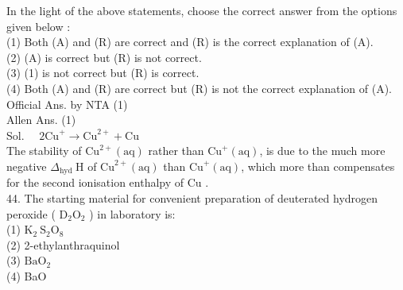 \documentclass[10pt]{article}
\begin{document}
In the light of the above statements, choose the correct answer from the options given below :\\
(1) Both (A) and (R) are correct and (R) is the correct explanation of (A).\\
(2) (A) is correct but (R) is not correct.\\
(3) (1) is not correct but (R) is correct.\\
(4) Both (A) and (R) are correct but (R) is not the correct explanation of (A).\\
Official Ans. by NTA (1)\\
Allen Ans. (1)\\
Sol. \(\quad 2 \mathrm{Cu}^{+} \rightarrow \mathrm{Cu}^{2+}+\mathrm{Cu}\)\\
The stability of \(\mathrm{Cu}^{2+}(\mathrm{aq})\) rather than \(\mathrm{Cu}^{+}(\mathrm{aq})\), is due to the much more negative \(\Delta_{\text {hyd }} \mathrm{H}\) of \(\mathrm{Cu}^{2+}(\mathrm{aq})\) than \(\mathrm{Cu}^{+}(\mathrm{aq})\), which more than compensates for the second ionisation enthalpy of Cu .\\
44. The starting material for convenient preparation of deuterated hydrogen peroxide ( \(\mathrm{D}_{2} \mathrm{O}_{2}\) ) in laboratory is:\\
(1) \(\mathrm{K}_{2} \mathrm{~S}_{2} \mathrm{O}_{8}\)\\
(2) 2-ethylanthraquinol\\
(3) \(\mathrm{BaO}_{2}\)\\
(4) BaO
\end{document}
